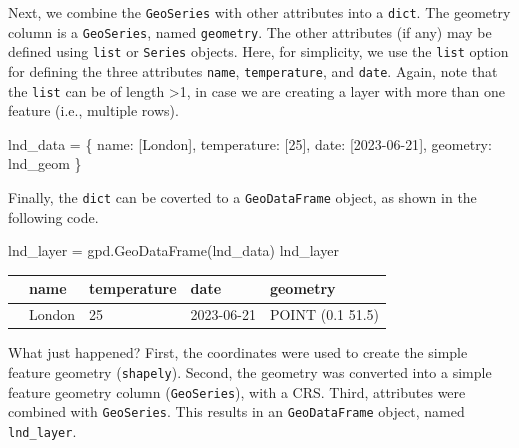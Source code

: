 \documentclass[
  letterpaper,
]{krantz}
\newenvironment{Shaded}{\begin{snugshade}}{\end{snugshade}}
\newcommand{\DecValTok}[1]{\textcolor[rgb]{0.68,0.00,0.00}{#1}}
\newcommand{\NormalTok}[1]{\textcolor[rgb]{0.00,0.23,0.31}{#1}}
\newcommand{\OperatorTok}[1]{\textcolor[rgb]{0.37,0.37,0.37}{#1}}
\newcommand{\StringTok}[1]{\textcolor[rgb]{0.13,0.47,0.30}{#1}}
\begin{document}
Next, we combine the \texttt{GeoSeries} with other attributes into a
\texttt{dict}. The geometry column is a \texttt{GeoSeries}, named
\texttt{geometry}. The other attributes (if any) may be defined using
\texttt{list} or \texttt{Series} objects. Here, for simplicity, we use
the \texttt{list} option for defining the three attributes
\texttt{name}, \texttt{temperature}, and \texttt{date}. Again, note that
the \texttt{list} can be of length \textgreater1, in case we are
creating a layer with more than one feature (i.e., multiple rows).

\begin{Shaded}
\begin{Highlighting}[]
\NormalTok{lnd\_data }\OperatorTok{=}\NormalTok{ \{}
  \StringTok{\textquotesingle{}name\textquotesingle{}}\NormalTok{: [}\StringTok{\textquotesingle{}London\textquotesingle{}}\NormalTok{],}
  \StringTok{\textquotesingle{}temperature\textquotesingle{}}\NormalTok{: [}\DecValTok{25}\NormalTok{],}
  \StringTok{\textquotesingle{}date\textquotesingle{}}\NormalTok{: [}\StringTok{\textquotesingle{}2023{-}06{-}21\textquotesingle{}}\NormalTok{],}
  \StringTok{\textquotesingle{}geometry\textquotesingle{}}\NormalTok{: lnd\_geom}
\NormalTok{\}}
\end{Highlighting}
\end{Shaded}

Finally, the \texttt{dict} can be coverted to a \texttt{GeoDataFrame}
object, as shown in the following code.

\begin{Shaded}
\begin{Highlighting}[]
\NormalTok{lnd\_layer }\OperatorTok{=}\NormalTok{ gpd.GeoDataFrame(lnd\_data)}
\NormalTok{lnd\_layer}
\end{Highlighting}
\end{Shaded}

\begin{longtable}[]{@{}lllll@{}}
\toprule\noalign{}
& name & temperature & date & geometry \\
\midrule\noalign{}
\endhead
\bottomrule\noalign{}
\endlastfoot
0 & London & 25 & 2023-06-21 & POINT (0.1 51.5) \\
\end{longtable}

What just happened? First, the coordinates were used to create the
simple feature geometry (\texttt{shapely}). Second, the geometry was
converted into a simple feature geometry column (\texttt{GeoSeries}),
with a CRS. Third, attributes were combined with \texttt{GeoSeries}.
This results in an \texttt{GeoDataFrame} object, named
\texttt{lnd\_layer}.
\end{document}

